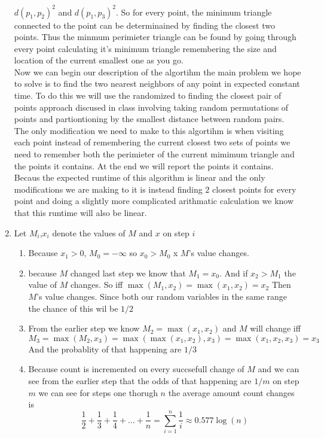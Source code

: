 \documentclass[11pt]{article}
\begin{document}
\begin{enumerate}
		$d(p_1,p_2)^2$  and $ d(p_1,p_3)^2 $.
		So for every point, the minimum triangle connected to the point
		can be determinained by finding the closest two points. Thus the
		minmum perimieter triangle can be found by going through every
		point calculating it's minimum triangle remembering the size and
		location of the current smallest one as you go.\\
		Now we can begin our description of the algortihm the main
		problem we hope to solve is to find the two nearest neighbors of
		any point in expected constant time. To do this we will use the
		randomized to finding the closest pair of points approach discused in class involving taking random permutations of points and partiontioning by the smallest
		distance between random pairs. The only modification we need to make to this
		algortihm is when visiting each point instead of remembering the
		current closest two sets of points we need to remember both
		the perimieter of the current mimimum triangle and the points it
		contains. At the end we will report the points it contains.
		Becaus the expected runtime of this algorithm is linear and the
		only modifications we are making to it is instead finding $2$
		closest points for every point and doing a slightly more
		complicated arithmatic calculation we know that this runtime
		will also be linear.

	\item 
		Let $M_i$,$x_i$ denote the values of $M$ and $x$ on step $i$
		\begin{enumerate}
		\item
			Because $x_1 > 0$, $M_0= - \infty $ so
			$x_0 > M_0$ x $M$'s value changes. 
		\item   because $M$ changed last step we know that $M_1 = x_0$.
			And if $x_2 > M_1 $ the value of $M$ changes.
			So iff 
				$\max(M_1, x_2) = \max(x_1,x_2) = x_2$	
			Then $M$'s value changes. Since both our random
			variables in the same range the chance of this wil be $1/2$
		\item From the earlier step we know $M_2 = \max(x_1,x_2)$ and
			$M$ will change iff
			$$M_3 = \max(M_2,x_3) = \max(\max(x_1,x_2),x_3)
			= \max(x_1,x_2,x_3) = x_3$$
			And the probablity of that happening are $1/3$
		\item Because count is incremented on every succsefull change of
			$M$ and we can see from the earlier step that the odds
				of that happening are $1/m$ on step $m$ we can
				see for steps one thorugh $n$ the average amount
				count changes is
			$$ \frac{1}{2}+ \frac{1}{3}+ \frac{1}{4} +...+
				\frac{1}{n} = \sum_{i = 1} ^ n \frac{1}{i}
				\approx 0.577 \log(n) $$


\end{enumerate}
\end{enumerate}
\end{document}
